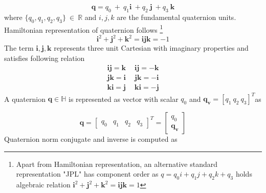 \begin{equation}
\mathbf{q} =q_{0} \ +\ q_{1}\mathbf{i} \ +q_{2} \ \mathbf{j} \ +q_{3} \ \mathbf{k}
\end{equation}
where $\displaystyle \{q_{0} ,q_{1} ,q_{2} ,q_{3}\} \ \in \ \mathbb{R}$ and $\displaystyle i,j,k$ are the fundamental quaternion units. Hamiltonian representation of quaternion follows \footnote{Apart from Hamiltonian representation, an alternative standard representation "JPL" \cite{Ortega2016QuaternionKF} has component order as $q=q_0i+q_1j+q_2k+q_3$ holds algebraic relation 
$\mathbf{i}^{2} +\mathbf{j}^{2} +\mathbf{k}^{2} =\mathbf{ijk} =1$}
\begin{equation}
\mathbf{i}^{2} +\mathbf{j}^{2} +\mathbf{k}^{2} =\mathbf{ijk} =-1
\end{equation}
The term $\displaystyle \mathbf{i} ,\mathbf{j} ,\mathbf{k}$ represents three unit Cartesian with imaginary properties and satisfies following relation
\begin{gather*}
\mathbf{ij} =\mathbf{k} \ \quad \mathbf{ij} =-\mathbf{k}\\
\mathbf{jk} =\mathbf{i} \ \quad \mathbf{jk} =-\mathbf{i}\\
\mathbf{ki} =\mathbf{j} \ \quad \mathbf{ki} =-\mathbf{j}
\end{gather*}
A quaternion $\displaystyle \mathbf{q} \in \mathbb{H}$ is represented as vector with scalar $\displaystyle q_{0}$ and $\displaystyle \mathbf{q_v} =[ q_{1} \ q_{2} \ q_{3}]^{T}$as


\begin{equation*}
\mathbf{q} =\begin{bmatrix}
q_{0} & q_{1} & q_{2} & q_{3}
\end{bmatrix}^{T} =\begin{bmatrix}
q_{0}\\
\mathbf{q_v}
\end{bmatrix}
\end{equation*}
Quaternion norm conjugate and inverse is computed as


